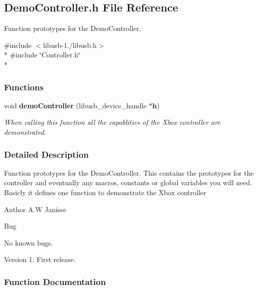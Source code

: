 \subsection{Demo\-Controller.\-h File Reference}
\label{_demo_controller_8h}


Function prototypes for the Demo\-Controller.  


{\ttfamily \#include $<$libusb-\/1./libusb.\-h$>$}\\*
{\ttfamily \#include \char`\"{}Controller.\-h\char`\"{}}\\*
\subsubsection*{Functions}
\begin{DoxyCompactItemize}
\item 
void {\bf demo\-Controller} (libusb\-\_\-device\-\_\-handle $\ast${\bf h})
\begin{DoxyCompactList}\small\item\em When calling this function all the capablities of the Xbox controller are demonstrated. \end{DoxyCompactList}\end{DoxyCompactItemize}


\subsubsection{Detailed Description}
Function prototypes for the Demo\-Controller. This contains the prototypes for the controller and eventually any macros, constants or global variables you will need. Basicly it defines one function to demonstrate the Xbox controller

\begin{DoxyAuthor}{Author}
A.\-W Janisse 
\end{DoxyAuthor}
\begin{DoxyRefDesc}{Bug}
\item[{\bf Bug}]No known bugs.\end{DoxyRefDesc}


\begin{DoxyVersion}{Version}
1. First release. 
\end{DoxyVersion}


\subsubsection{Function Documentation}

